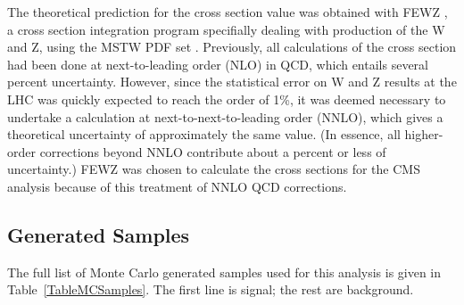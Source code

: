 








The theoretical prediction for the cross section value 
was obtained with FEWZ \cite{FEWZ2}, 
a cross section integration program 
specifially dealing with production of the W and Z, 
using the MSTW PDF set \cite{MSTW}.  
Previously, all calculations of the cross section 
had been done at next-to-leading order (NLO) in QCD, 
which entails several percent uncertainty.  
However, since the statistical error on 
W and Z results at the LHC 
was quickly expected to reach the order of 1\%, 
it was deemed necessary to undertake 
a calculation at next-to-next-to-leading order (NNLO), 
which gives a theoretical uncertainty of 
approximately the same value.  
(In essence, all higher-order corrections beyond NNLO 
contribute about a percent or less of uncertainty.)  
FEWZ was chosen to calculate the cross sections 
for the CMS analysis 
because of this treatment of NNLO QCD corrections.  


\subsection{Generated Samples}
\label{sim:MCSamples}

The full list of Monte Carlo generated samples 
used for this analysis 
is given in Table~\ref{TableMCSamples}.  
The first line is signal; the rest are background.  

